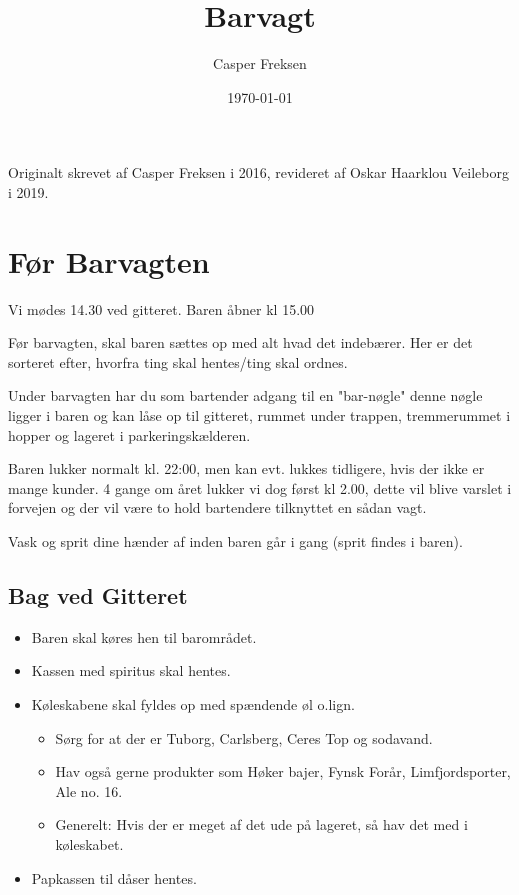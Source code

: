 

\title{Barvagt}
\date{\today}
\author{Casper Freksen}



\maketitle

\tableofcontents

\vspace{0.4cm}
Originalt skrevet af Casper Freksen i 2016, revideret af Oskar Haarklou Veileborg i 2019.

\section{Før Barvagten}
\label{sec:pre-barvagten}

Vi mødes 14.30 ved gitteret. Baren åbner kl 15.00

Før barvagten, skal baren sættes op med alt hvad det indebærer. Her er
det sorteret efter, hvorfra ting skal hentes/ting skal ordnes.

Under barvagten har du som bartender adgang til en "bar-nøgle" denne nøgle ligger i baren og kan låse op til gitteret, rummet under trappen, tremmerummet i hopper og lageret i parkeringskælderen.

Baren lukker normalt kl. 22:00, men kan evt. lukkes tidligere, hvis der ikke er mange kunder.
4 gange om året lukker vi dog først kl 2.00, dette vil blive varslet i forvejen og der vil være to hold bartendere tilknyttet en sådan vagt.

Vask og sprit dine hænder af inden baren går i gang (sprit findes i baren).

\subsection{Bag ved Gitteret}
\label{sec:pre:bag-ved-gitteret}

\begin{itemize}
\item Baren skal køres hen til barområdet.
\item Kassen med spiritus skal hentes.
\item Køleskabene skal fyldes op med spændende øl o.lign.
  \begin{itemize}
  \item Sørg for at der er Tuborg, Carlsberg, Ceres Top og sodavand.
  \item Hav også gerne produkter som Høker bajer, Fynsk Forår, Limfjordsporter, Ale no. 16.
  \item Generelt: Hvis der er meget af det ude på lageret, så hav det med i køleskabet.
  \end{itemize}
\item Papkassen til dåser hentes.
\end{itemize}

